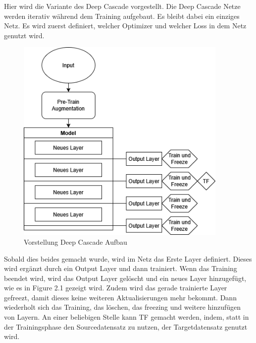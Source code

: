Hier wird die Variante des Deep Cascade vorgestellt. 
Die Deep Cascade Netze werden iterativ während dem Training aufgebaut. Es bleibt dabei ein einziges Netz. Es wird zuerst 
definiert, welcher Optimizer und welcher Loss in dem Netz genutzt wird. 

\begin{figure}[htpb]
    \includegraphics[height=10cm]{../../Graphiken/deepcascade_2.png}
    \caption{\label{fig:deepcascade} Vorstellung Deep Cascade Aufbau}
\end{figure}

Sobald dies beides gemacht wurde, wird im Netz das Erste Layer definiert. Dieses wird ergänzt durch ein Output Layer und dann trainiert. 
Wenn das Training beendet wird, wird das Output Layer gelöscht und ein neues Layer hinzugefügt, wie es in Figure 2.1 gezeigt wird. Zudem wird 
das gerade trainierte Layer gefreezt, damit dieses keine weiteren Aktualisierungen mehr bekommt. 
Dann wiederholt sich das Training, das löschen, das freezing und weitere hinzufügen von Layern. 
An einer beliebigen Stelle kann TF gemacht werden, indem, statt in der Trainingsphase den Sourcedatensatz zu nutzen, der Targetdatensatz 
genutzt wird. 

